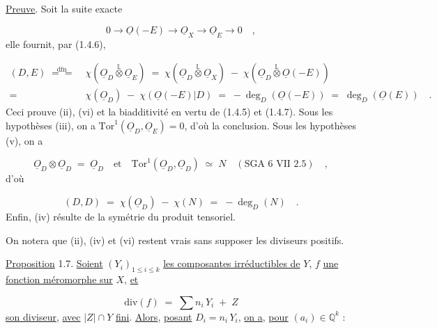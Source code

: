 \underline{Preuve}. Soit la suite exacte

\begin{equation*}
0 \longrightarrow \underline{O}(-E) \longrightarrow \underline{O}_X \longrightarrow \underline{O}_E \longrightarrow 0 \quad ,
\end{equation*}
elle fournit, par (1.4.6),

\begin{equation*}
\begin{array}{rl}
(D,E) \;\overset{\mathrm{dfn}}{=\!=}\; & \chi(\underline{O}_D \overset{\mathbb{L}}{\otimes} \underline{O}_E) \;=\; \chi(\underline{O}_D \overset{\mathbb{L}}{\otimes} \underline{O}_X) \;-\; \chi(\underline{O}_D \overset{\mathbb{L}}{\otimes} \underline{O}(-E)) \\[3ex]
= & \chi(\underline{O}_D) \;-\; \chi(\underline{O}(-E)\vert D) \;=\; - \deg_D (\underline{O}(-E)) \;=\; \deg_D (\underline{O}(E)) \quad .
\end{array}
\end{equation*}
Ceci prouve (ii), (vi) et la biadditivité en vertu de (1.4.5) et (1.4.7). Sous les hypothèses (iii), on a $\mathrm{Tor}^{1}(\underline{O}_D,\underline{O}_E) = 0$, d'où la conclusion. Sous les hypothèses (v), on a

\begin{equation*}
\underline{O}_D \otimes \underline{O}_D \;=\; \underline{O}_D \quad \text{et} \quad \mathrm{Tor}^{1}(\underline{O}_D,\underline{O}_D) \;\simeq\; N \quad (\text{SGA 6 VII 2.5}) \quad ,
\end{equation*}
d'où

\begin{equation*}
(D,D) \;=\; \chi(\underline{O}_D) \;-\; \chi(N) \;=\; - \deg_D(N) \quad .
\end{equation*}
Enfin, (iv) résulte de la symétrie du produit tensoriel.

On notera que (ii), (iv) et (vi) restent vrais sans supposer les diviseurs positifs.



\underline{Proposition} 1.7. \underline{Soient} $(Y_i)_{1 \leq i \leq k}$ \underline{les composantes irréductibles de} $Y$, $f$ \underline{une fonction méromorphe sur} $X$, \underline{et}

\begin{equation*}
\mathrm{div}(f) \;=\; \sum n_i\, Y_i \;+\; Z
\end{equation*}
\underline{son diviseur}, \underline{avec} $|Z| \cap Y$ \underline{fini}. \underline{Alors}, \underline{posant} $D_i = n_i\, Y_i$, \underline{on a}, \underline{pour} $(a_i) \in \mathbb{Q}^k$ :

